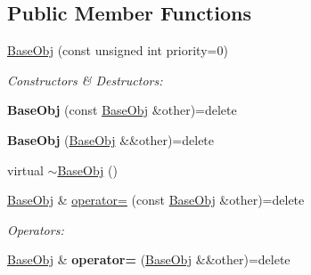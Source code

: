 \subsection*{Public Member Functions}
\begin{DoxyCompactItemize}
\item 
\hyperlink{class_helios_1_1_base_obj_ad77bdec51d537c1bfc9661b728980498}{Base\+Obj} (const unsigned int priority=0)
\begin{DoxyCompactList}\small\item\em Constructors \& Destructors\+: \end{DoxyCompactList}\item 
\hypertarget{class_helios_1_1_base_obj_aa278e49125c0c84d26906ae47cfff727}{}{\bfseries Base\+Obj} (const \hyperlink{class_helios_1_1_base_obj}{Base\+Obj} \&other)=delete\label{class_helios_1_1_base_obj_aa278e49125c0c84d26906ae47cfff727}

\item 
\hypertarget{class_helios_1_1_base_obj_ad2127aa4f505b6183a9d91d384062b98}{}{\bfseries Base\+Obj} (\hyperlink{class_helios_1_1_base_obj}{Base\+Obj} \&\&other)=delete\label{class_helios_1_1_base_obj_ad2127aa4f505b6183a9d91d384062b98}

\item 
virtual \hyperlink{class_helios_1_1_base_obj_a286cd12e5193430bb3ef554aac0152d9}{$\sim$\+Base\+Obj} ()
\item 
\hypertarget{class_helios_1_1_base_obj_a499a49d6f7f7f79190e6d598eab4391e}{}\hyperlink{class_helios_1_1_base_obj}{Base\+Obj} \& \hyperlink{class_helios_1_1_base_obj_a499a49d6f7f7f79190e6d598eab4391e}{operator=} (const \hyperlink{class_helios_1_1_base_obj}{Base\+Obj} \&other)=delete\label{class_helios_1_1_base_obj_a499a49d6f7f7f79190e6d598eab4391e}

\begin{DoxyCompactList}\small\item\em Operators\+: \end{DoxyCompactList}\item 
\hypertarget{class_helios_1_1_base_obj_ab588e3ffe972a53de418f50558651f2f}{}\hyperlink{class_helios_1_1_base_obj}{Base\+Obj} \& {\bfseries operator=} (\hyperlink{class_helios_1_1_base_obj}{Base\+Obj} \&\&other)=delete\label{class_helios_1_1_base_obj_ab588e3ffe972a53de418f50558651f2f}


\end{DoxyCompactItemize}
